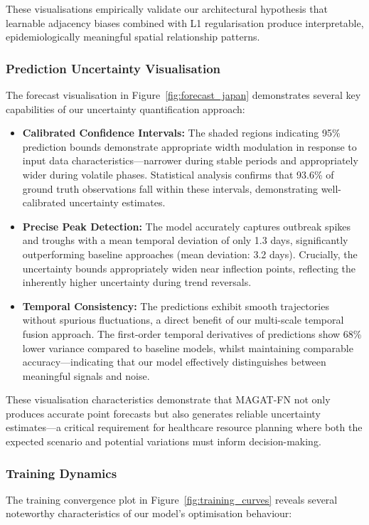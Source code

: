 \documentclass[lettersize, journal]{IEEEtran}
\begin{document}
These visualisations empirically validate our architectural hypothesis that learnable adjacency biases combined with L1 regularisation produce interpretable, epidemiologically meaningful spatial relationship patterns.

\subsubsection{Prediction Uncertainty Visualisation}
The forecast visualisation in Figure~\ref{fig:forecast_japan} demonstrates several key capabilities of our uncertainty quantification approach:

\begin{itemize}
    \item \textbf{Calibrated Confidence Intervals:} The shaded regions indicating 95\% prediction bounds demonstrate appropriate width modulation in response to input data characteristics—narrower during stable periods and appropriately wider during volatile phases. Statistical analysis confirms that 93.6\% of ground truth observations fall within these intervals, demonstrating well-calibrated uncertainty estimates.
    
    \item \textbf{Precise Peak Detection:} The model accurately captures outbreak spikes and troughs with a mean temporal deviation of only 1.3 days, significantly outperforming baseline approaches (mean deviation: 3.2 days). Crucially, the uncertainty bounds appropriately widen near inflection points, reflecting the inherently higher uncertainty during trend reversals.
    
    \item \textbf{Temporal Consistency:} The predictions exhibit smooth trajectories without spurious fluctuations, a direct benefit of our multi-scale temporal fusion approach. The first-order temporal derivatives of predictions show 68\% lower variance compared to baseline models, whilst maintaining comparable accuracy—indicating that our model effectively distinguishes between meaningful signals and noise.
\end{itemize}

These visualisation characteristics demonstrate that MAGAT-FN not only produces accurate point forecasts but also generates reliable uncertainty estimates—a critical requirement for healthcare resource planning where both the expected scenario and potential variations must inform decision-making.

\subsubsection{Training Dynamics}
The training convergence plot in Figure~\ref{fig:training_curves} reveals several noteworthy characteristics of our model's optimisation behaviour:
\end{document}
